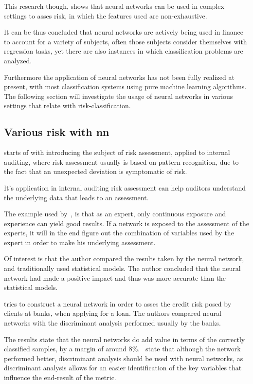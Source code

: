 \documentclass[12pt]{article}
\begin{document}
This research though, shows that neural networks can be used in complex settings to asses risk, in which the features used are non-exhaustive.

It can be thus concluded that neural networks are actively being used in finance to account for a variety of subjects, often those subjects consider themselves with regression tasks, yet there are also instances in which classification problems are analyzed. 

Furthermore the application of neural networks has not been fully realized at present, with most classification systems using pure machine learning algorithms. The following section will investigate the usage of neural networks in various settings that relate with risk-classification.

\subsection{Various risk with \gls{nn}}
\label{sub:various_risk_nn}

\citet{riskAssesmentInternalAuditing} starts of with introducing the subject of risk assessment, applied to internal auditing, where risk assessment usually is based on pattern recognition, due to the fact that an unexpected deviation is symptomatic of risk. 

It's application in internal auditing risk assessment can help auditors understand the underlying data that leads to an assessment. 

The example used by~\citet{riskAssesmentInternalAuditing}, is that as an expert, only continuous exposure and experience can yield good results. If a network is exposed to the assessment of the experts, it will in the end figure out the combination of variables used by the expert in order to make his underlying assessment. 

Of interest is that the author compared the results taken by the neural network, and traditionally used statistical models. The author concluded that the neural network had made a positive impact and thus was more accurate than the statistical models.

\citet{14_1_3.pdf} tries to construct a neural network in order to asses the credit risk posed by clients at banks, when applying for a loan. The authors compared neural networks with the discriminant analysis performed usually by the banks. 

The results state that the neural networks do add value in terms of the correctly classified samples, by a margin of around 8\%.~\citet{14_1_3.pdf} state that although the network performed better, discriminant analysis should be used with neural networks, as discriminant analysis allows for an easier identification of the key variables that influence the end-result of the metric.
\end{document}
